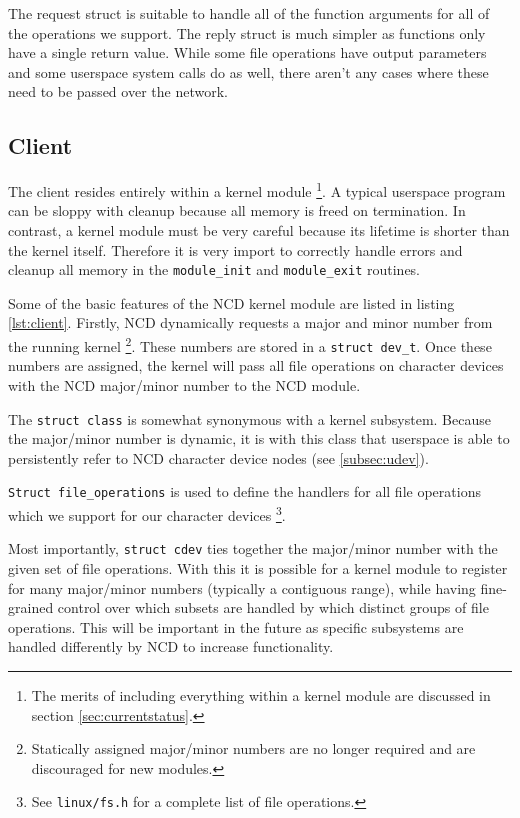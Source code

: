 \documentclass[11pt,twocolumn]{article}
\begin{document}
The request struct is suitable to handle all of the function arguments
for all of the operations we support. The reply struct is much simpler
as functions only have a single return value. While some file operations
have output parameters and some userspace system calls do as well, there
aren't any cases where these need to be passed over the network.

\subsection{Client}



The client resides entirely within a kernel module \footnote{The merits
of including everything within a kernel module are discussed in section
\ref{sec:currentstatus}.}. A typical userspace program can be sloppy
with cleanup because all memory is freed on termination. In contrast, a
kernel module must be very careful because its lifetime is shorter than
the kernel itself. Therefore it is very import to correctly handle
errors and cleanup all memory in the \texttt{module\_init} and
\texttt{module\_exit} routines.

Some of the basic features of the NCD kernel module are listed in
listing \ref{lst:client}. Firstly, NCD dynamically requests a major and
minor number from the running kernel \footnote{Statically assigned
major/minor numbers are no longer required and are discouraged for new
modules.}. These numbers are stored in a \texttt{struct dev\_t}. Once
these numbers are assigned, the kernel will pass all file operations on
character devices with the NCD major/minor number to the NCD module.

The \texttt{struct class} is somewhat synonymous with a kernel
subsystem. Because the major/minor number is dynamic, it is with this
class that userspace is able to persistently refer to NCD character
device nodes (see \ref{subsec:udev}).

\texttt{Struct file\_operations} is used to define the handlers for all
file operations which we support for our character devices \footnote{See
\texttt{linux/fs.h} for a complete list of file operations.}.

Most importantly, \texttt{struct cdev} ties together the major/minor
number with the given set of file operations. With this it is possible
for a kernel module to register for many major/minor numbers (typically
a contiguous range), while having fine-grained control over which
subsets are handled by which distinct groups of file operations. This
will be important in the future as specific subsystems are handled
differently by NCD to increase functionality.
\end{document}
